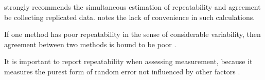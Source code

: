 \documentclass[12pt, a4paper]{article}
\begin{document}
\citet{BA99} strongly recommends the simultaneous estimation of
repeatability and agreement be collecting replicated data.
\citet{ARoy2009} notes the lack of convenience in such
calculations.


If one method has poor repeatability in the sense of considerable
variability, then agreement between two methods is bound to be
poor \citep{ARoy2009}.

It is important to report repeatability when assessing
measurement, because it measures the purest form of random error
not influenced by other factors \citep{Barnhart}.
\end{document}
